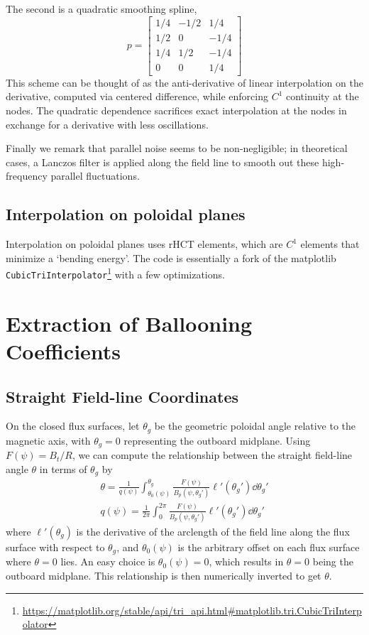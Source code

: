 \documentclass[]{article}
\begin{document}
The second is a quadratic smoothing spline,
\begin{equation*}
	p = \begin{bmatrix}
		1/4 & -1/2 & 1/4 \\
		1/2 & 0 & -1/4 \\
		1/4 & 1/2 & -1/4 \\
		0 & 0 & 1/4
	\end{bmatrix}
\end{equation*}
This scheme can be thought of as the anti-derivative of linear interpolation on the derivative, computed via centered difference, while enforcing \(C^1\) continuity at the nodes.
The quadratic dependence sacrifices exact interpolation at the nodes in exchange for a derivative with less oscillations.

Finally we remark that parallel noise seems to be non-negligible; in theoretical cases, a Lanczos filter is applied along the field line to smooth out these high-frequency parallel fluctuations.


\subsection{Interpolation on poloidal planes}

Interpolation on poloidal planes uses rHCT elements, which are \(C^1\) elements that minimize a `bending energy'.
The code is essentially a fork of the matplotlib \texttt{CubicTriInterpolator}\footnote{\url{https://matplotlib.org/stable/api/tri_api.html#matplotlib.tri.CubicTriInterpolator}} with a few optimizations.

\section{Extraction of Ballooning Coefficients}

\subsection{Straight Field-line Coordinates}
On the closed flux surfaces, let \(\theta_g\) be the geometric poloidal angle relative to the magnetic axis, with \(\theta_g = 0\) representing the outboard midplane.
Using \(F(\psi) = B_t / R\), we can compute the relationship between the straight field-line angle \(\theta\) in terms of \(\theta_g\) by
\begin{gather*}
	\theta = \frac{1}{q(\psi)} \int_{\theta_0(\psi)}^{\theta_g} \frac{F(\psi)}{B_p(\psi,\theta_g')} \ell'(\theta_g') \dd{\theta_g'} \\
	q(\psi) = \frac{1}{2\pi} \int_{0}^{2\pi} \frac{F(\psi)}{B_p(\psi,\theta_g')} \ell'(\theta_g') \dd{\theta_g'}
\end{gather*}
where \(\ell'(\theta_g)\) is the derivative of the arclength of the field line along the flux surface with respect to \(\theta_g\), and \(\theta_0(\psi)\) is the arbitrary offset on each flux surface where \(\theta=0\) lies.
An easy choice is \(\theta_0(\psi) = 0\), which results in \(\theta=0\) being the outboard midplane.
This relationship is then numerically inverted to get \(\theta\).
\end{document}
